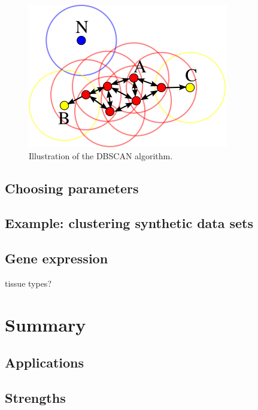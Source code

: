 \documentclass[]{book}
\theoremstyle{definition}
\theoremstyle{definition}
\theoremstyle{definition}
\theoremstyle{remark}
\begin{document}
\begin{figure}

{\centering \includegraphics[width=0.75\linewidth]{images/DBSCAN_Illustration} 

}

\caption{Illustration of the DBSCAN algorithm.}\label{fig:dbscanIllustration}
\end{figure}

\subsection{Choosing parameters}\label{choosing-parameters}

\subsection{Example: clustering synthetic data
sets}\label{example-clustering-synthetic-data-sets-2}

\subsection{Gene expression}\label{gene-expression}

tissue types?

\section{Summary}\label{summary}

\subsection{Applications}\label{applications}

\subsection{Strengths}\label{strengths}
\end{document}

